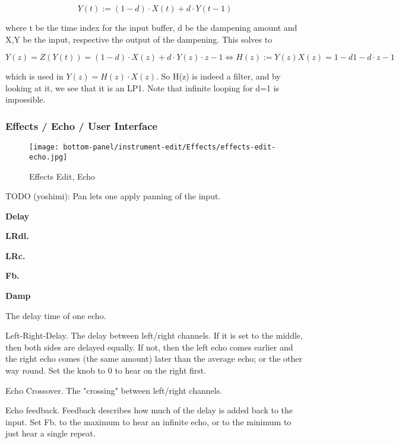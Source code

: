    \[Y(t):=(1-d)⋅X(t)+d⋅Y(t-1)\]

   where t be the time index for the input buffer, d be the dampening amount
   and X,Y be the input, respective the output of the dampening. This solves
   to

   \[Y(z)=Z(Y(t))=(1-d)⋅X(z)+d⋅Y(z)⋅z-1 ⇔ H(z):=Y(z)X(z)=1-d1-d⋅z-1\]

   which is used in \(Y(z)=H(z)⋅X(z)\). So H(z) is indeed a filter, and by
   looking at it, we see that it is an LP1. Note that infinite looping for
   d=1 is impossible.

\subsubsection{Effects / Echo / User Interface}
\label{subsubsec:effects_edit_echo_ui}

\begin{figure}[H]
   \centering 
   \texttt{[image: bottom-panel/instrument-edit/Effects/effects-edit-echo.jpg]}
   \caption{Effects Edit, Echo}
   \label{fig:effects_edit_echo}
\end{figure}

   TODO (yoshimi):  Pan lets one apply panning of the input.

   \begin{enumber}
      \item \textbf{Delay}
      \item \textbf{LRdl.}
      \item \textbf{LRc.}
      \item \textbf{Fb.}
      \item \textbf{Damp}
   \end{enumber}

   \setcounter{ItemCounter}{0}      %
 
   The delay time of one echo.

   Left-Right-Delay.
   The delay between left/right channels.
   If it is set to the middle, then both sides are delayed equally. If
   not, then the left echo comes earlier and the right echo comes (the
   same amount) later than the average echo; or the other way round.
   Set the knob to 0 to hear on the right first.

   Echo Crossover.
   The "crossing" between left/right channels.

   Echo feedback.
   Feedback describes how much of the delay is added back to the input.
   Set Fb. to the maximum to hear an infinite echo, or to the minimum to
   just hear a single repeat.

